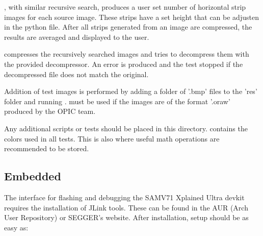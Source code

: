 \documentclass[12pt, a4paper]{article}
\begin{document}
\medskip
\noindent
{}, with similar recursive search, produces a user set number of horizontal strip images for each source image. 
These strips have a set height that can be adjusten in the python file. 
After all strips generated from an image are compressed, the results are averaged and displayed to the user. 

\medskip
\noindent
{} compresses the recursively searched images and tries to decompress them with the provided decompressor.
An error is produced and the test stopped if the decompressed file does not match the original.

\medskip
\noindent
Addition of test images is performed by adding a folder of '.bmp' files to the 'res' folder and running . 
 must be used if the images are of the format '.oraw' produced by the OPIC team. 

\medskip
\noindent
Any additional scripts or tests should be placed in this directory. 
  contains the colors used in all tests. 
This is also where useful math operations are recommended to be stored. 

\newpage
\subsection{Embedded}
The interface for flashing and debugging the SAMV71 Xplained Ultra devkit requires the installation of JLink tools. 
These can be found in the AUR (Arch User Repository) or SEGGER's website.
After installation, setup should be as easy as:
\end{document}
